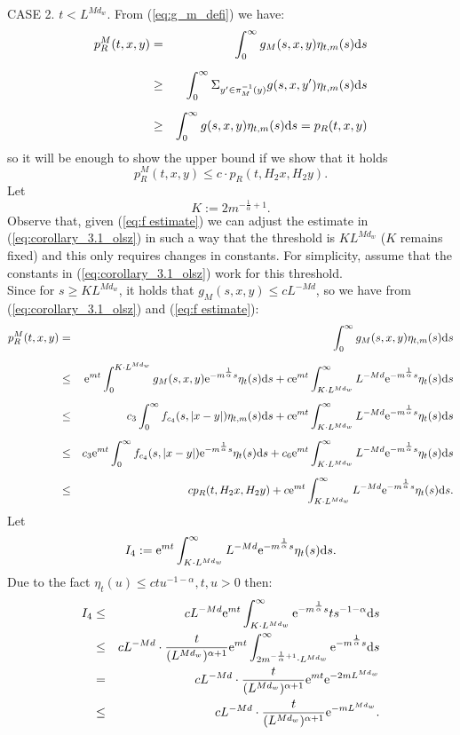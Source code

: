 \documentclass[11pt]{article}
\begin{document}
\noindent\textsc{CASE 2.} $t < L^{Md_{w}}.$ From (\ref{eq:g_m_defi}) we have:
\begin{eqnarray*}
p^M_R(t,x,y) & = & \int_0^{\infty} g_M(s,x,y) \eta_{t,m}(s){\rm d}s\\[2mm]
& \geq & \int_0^{\infty} \Sigma_{y' \in \pi^{-1}_M(y)}g(s,x,y') \eta_{t,m}(s){\rm d}s\\[2mm]
& \geq & \int_0^{\infty} g(s,x,y) \eta_{t,m}(s){\rm d}s = p_R(t,x,y)
\end{eqnarray*}
so it will be enough to show the upper bound if we show that it holds
$$
p^M_R(t,x,y) \leq c\cdot p_R(t, H_2x,H_2y).
$$
Let
$$
K := 2m^{-\frac{1}{\alpha}+1}.
$$
Observe that, given (\ref{eq:f estimate}) we can adjust the estimate in (\ref{eq:corollary_3.1_olsz}) in such a way that the threshold is $KL^{Md_w}$ ($K$ remains fixed) and this only requires changes in constants. For simplicity, assume that the constants in (\ref{eq:corollary_3.1_olsz}) work for this threshold.\\
Since for $s \geq KL^{Md_w}$, it holds that $g_M(s,x,y) \leq cL^{-Md}$, so we have from (\ref{eq:corollary_3.1_olsz}) and (\ref{eq:f estimate}):
\begin{eqnarray*}
p^M_R(t,x,y) & = & \int_0^{\infty} g_M(s,x,y) \eta_{t,m}(s){\rm d}s\\[2mm]
 & \leq & {\rm e}^{mt}\int_{0}^{K\cdot L^{Md_w}}g_M(s,x,y){\rm e}^{-m^{\frac{1}{\alpha}}s}\eta_{t}(s){\rm d}s + c{\rm e}^{mt}\int_{K\cdot L^{Md_w}}^{\infty}L^{-Md}{\rm e}^{-m^{\frac{1}{\alpha}}s}\eta_{t}(s){\rm d}s\\[2mm]
 & \leq & c_3\int_{0}^{\infty}f_{c_4}(s,|x-y|)\eta_{t,m}(s){\rm d}s + c{\rm e}^{mt}\int_{K\cdot L^{Md_w}}^{\infty}L^{-Md}{\rm e}^{-m^{\frac{1}{\alpha}}s}\eta_{t}(s){\rm d}s\\[2mm]
 & \leq & c_3{\rm e}^{mt}\int_{0}^{\infty}f_{c_4}(s,|x-y|){\rm e}^{-m^{\frac{1}{\alpha}}s}\eta_{t}(s){\rm d}s + c_6{\rm e}^{mt}\int_{K\cdot L^{Md_w}}^{\infty}L^{-Md}{\rm e}^{-m^{\frac{1}{\alpha}}s}\eta_{t}(s){\rm d}s\\[2mm]
 & \leq & cp_R(t,H_2x,H_2y) + c{\rm e}^{mt}\int_{K\cdot L^{Md_{w}}}^{\infty}L^{-Md}{\rm e}^{-m^{\frac{1}{\alpha}}s}\eta_{t}(s){\rm d}s.
\end{eqnarray*}
Let
$$
I_4 := {\rm e}^{mt}\int_{K\cdot L^{Md_{w}}}^{\infty}L^{-Md}{\rm e}^{-m^{\frac{1}{\alpha}}s}\eta_{t}(s){\rm d}s.
$$
Due to the fact $\eta_{t}(u) \leq ctu^{-1-\alpha}, t,u > 0$ \cite[formula (9), p.4]{bib:BSS} then:
\begin{eqnarray*}
I_4 & \leq & cL^{-Md}{\rm e}^{mt}\int_{K\cdot L^{Md_{w}}}^{\infty}{\rm e}^{-m^{\frac{1}{\alpha}}s}ts^{-1-\alpha}{\rm d}s \\
 & \leq & cL^{-Md}  \cdot \frac{t}{(L^{Md_{w}})^{\alpha + 1}} {\rm e}^{mt}\int_{2m^{-\frac{1}{\alpha}+1}\cdot L^{Md_{w}}}^{\infty}{\rm e}^{-m^{\frac{1}{\alpha}}s}{\rm d}s \\
 & = & cL^{-Md}  \cdot \frac{t}{(L^{Md_{w}})^{\alpha + 1}} {\rm e}^{mt}{\rm e}^{-2mL^{Md_{w}}} \\
 & \leq & cL^{-Md}  \cdot \frac{t}{(L^{Md_{w}})^{\alpha + 1}} {\rm e}^{-mL^{Md_{w}}}.
\end{eqnarray*}
\end{document}
